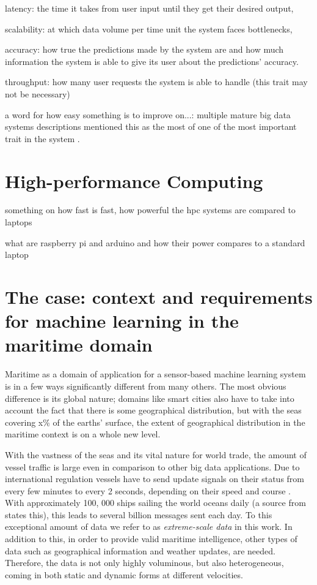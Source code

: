 latency: the time it takes from user input until they get their desired output,

scalability: at which data volume per time unit the system faces bottlenecks,

accuracy: how true the predictions made by the system are and how much information the system is able to give its user about the predictions' accuracy.

throughput: how many user requests the system is able to handle (this trait may not be necessary)

a word for how easy something is to improve on...: multiple mature big data systems descriptions mentioned this as the most of one of the most important trait in the system \cite{uber} \cite{facebook}.

\section{High-performance Computing}

something on how fast is fast, how powerful the hpc systems are compared to laptops

what are raspberry pi and arduino and how their power compares to a standard laptop

\section{The case: context and requirements for machine learning in the maritime domain}

Maritime as a domain of application for a sensor-based machine learning system is in a few ways significantly different from many others. The most obvious difference is its global nature; domains like smart cities also have to take into account the fact that there is some geographical distribution, but with the seas covering x\% of the earths' surface, the extent of geographical distribution in the maritime context is on a whole new level.

With the vastness of the seas and its vital nature for world trade, the amount of vessel traffic is large even in comparison to other big data applications. Due to international regulation vessels have to send update signals on their status from every few minutes to every 2 seconds, depending on their speed and course \cite{maritimeinformatics}. With approximately 100, 000 ships sailing the world oceans daily (a source from \cite{maritimeinformatics} states this), this leads to several billion messages sent each day. To this exceptional amount of data we refer to as \textit{extreme-scale data} in this work. In addition to this, in order to provide valid maritime intelligence, other types of data such as geographical information and weather updates, are needed. Therefore, the data is not only highly voluminous, but also heterogeneous, coming in both static and dynamic forms at different velocities.

